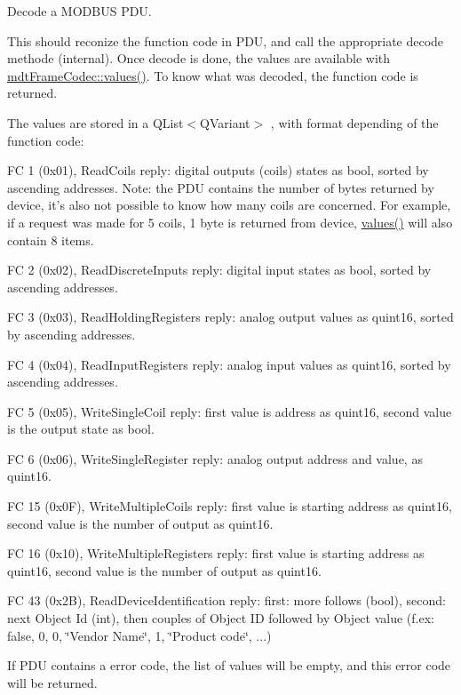 Decode a MODBUS PDU. 

This should reconize the function code in PDU, and call the appropriate decode methode (internal). Once decode is done, the values are available with \hyperlink{classmdt_frame_codec_af3353b74e1ab64ad7cc764dcaf22e7e8}{mdtFrameCodec::values()}. To know what was decoded, the function code is returned.

The values are stored in a QList$<$QVariant$>$ , with format depending of the function code:
\begin{DoxyItemize}
\item FC 1 (0x01), ReadCoils reply: digital outputs (coils) states as bool, sorted by ascending addresses. Note: the PDU contains the number of bytes returned by device, it's also not possible to know how many coils are concerned. For example, if a request was made for 5 coils, 1 byte is returned from device, \hyperlink{classmdt_frame_codec_af3353b74e1ab64ad7cc764dcaf22e7e8}{values()} will also contain 8 items.
\item FC 2 (0x02), ReadDiscreteInputs reply: digital input states as bool, sorted by ascending addresses.
\item FC 3 (0x03), ReadHoldingRegisters reply: analog output values as quint16, sorted by ascending addresses.
\item FC 4 (0x04), ReadInputRegisters reply: analog input values as quint16, sorted by ascending addresses.
\item FC 5 (0x05), WriteSingleCoil reply: first value is address as quint16, second value is the output state as bool.
\item FC 6 (0x06), WriteSingleRegister reply: analog output address and value, as quint16.
\item FC 15 (0x0F), WriteMultipleCoils reply: first value is starting address as quint16, second value is the number of output as quint16.
\item FC 16 (0x10), WriteMultipleRegisters reply: first value is starting address as quint16, second value is the number of output as quint16.
\item FC 43 (0x2B), ReadDeviceIdentification reply: first: more follows (bool), second: next Object Id (int), then couples of Object ID followed by Object value (f.ex: false, 0, 0, \char`\"{}Vendor Name\char`\"{}, 1, \char`\"{}Product code\char`\"{}, ...)
\end{DoxyItemize}

If PDU contains a error code, the list of values will be empty, and this error code will be returned.

